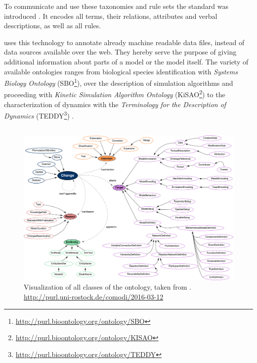 	To communicate and use these taxonomies and rule sets the \owl standard was introduced \citep{Bechhofer2004,Bechhofer2009}. It encodes all terms, their relations, attributes and verbal descriptions, as well as all rules.
	
	\sysbio uses this technology to annotate already machine readable data files, instead of data sources available over the web. They hereby serve the purpose of giving additional information about parts of a model or the model itself. The variety of available ontologies ranges from biological species identification with \emph{Systems Biology Ontology} (SBO\footnote{\url{http://purl.bioontology.org/ontology/SBO}}), over the description of simulation algorithms and proceeding with \emph{Kinetic Simulation Algorithm Ontology} (KiSAO\footnote{\url{http://purl.bioontology.org/ontology/KISAO}}) to the characterization of dynamics with the \emph{Terminology for the Description of Dynamics} (TEDDY\footnote{\url{http://purl.bioontology.org/ontology/TEDDY}}) \citep{Courtot2011}.
	

	
	\subsection{\comodi}
	\label{sec:background:onto:comodi}
	
	\begin{figure}[h]
		\centering
		\includegraphics[width=\textwidth,keepaspectratio]{resources/comodi-overview.pdf}
		\caption[Visualisation of \comodi]{Visualization of all classes of the \comodi ontology, taken from \citealt{Scharm2016}. \url{http://purl.uni-rostock.de/comodi/2016-03-12}}
		\label{fig:background:onto:comodi}
	\end{figure}
	
